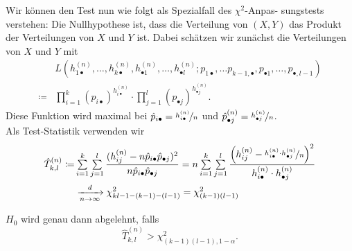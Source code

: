 \documentclass{cheat-sheet}
\begin{document}
\begin{verf}
  Wir können den Test nun wie folgt als Spezialfall des $\chi^2$-Anpas- sungstests verstehen: Die Nullhypothese ist, dass die Verteilung von $(X, Y)$ das Produkt der Verteilungen von $X$ und $Y$ ist.
  Dabei schätzen wir zunächst die Verteilungen von $X$ und $Y$ mit
  \begin{align*}
    & L(h_{1 \bullet}^{(n)}, \ldots, h_{k \bullet}^{(n)}, h_{\bullet 1}^{(n)}, \ldots, h_{\bullet l}^{(n)}; p_{1 \bullet}, \ldots p_{k-1, \bullet}, p_{\bullet 1}, \ldots, p_{\bullet, l-1}) \\
    \coloneqq & \prod_{i=1}^{k} (p_{i \bullet})^{h_{i \bullet}^{(n)}} \cdot \prod_{j=1}^l (p_{\bullet j})^{h_{\bullet j}^{(n)}}.
  \end{align*}
  Diese Funktion wird maximal bei $\hat{p}_{i \bullet} = \nicefrac{h_{i \bullet}^{(n)}}{n}$ und $\hat{p}_{\bullet j}^{(n)} = \nicefrac{h_{\bullet j}^{(n)}}{n}$. \\
  Als Test-Statistik verwenden wir
  \begin{align*}
    \hat{T}_{k,l}^{(n)} \coloneqq &
    \sum_{i=1}^k \sum_{j=1}^l \frac{(h_{ij}^{(n)} - n \hat{p}_{i \bullet} \hat{p}_{\bullet j})^2}{n \hat{p}_{i \bullet} \hat{p}_{\bullet j}} =
    n \sum_{i=1}^k \sum_{j=1}^l \frac{\left( h_{ij}^{(n)} - \nicefrac{h_{i \bullet}^{(n)} \cdot h_{\bullet j}^{(n)}}{n} \right)^2}{h_{i \bullet}^{(n)} \cdot h_{\bullet j}^{(n)}} \\
    & \xra[n \to \infty]{d} \chi^2_{kl - 1 - (k{-}1) - (l{-}1)} = \chi^2_{(k-1)(l-1)}
  \end{align*}
\end{verf}

\begin{entscheidungsregel}
  $H_0$ wird genau dann abgelehnt, falls
  \[ \hat{T}_{k,l}^{(n)} > \chi^2_{(k-1)(l-1),1-\alpha}. \]
\end{entscheidungsregel}
\end{document}
